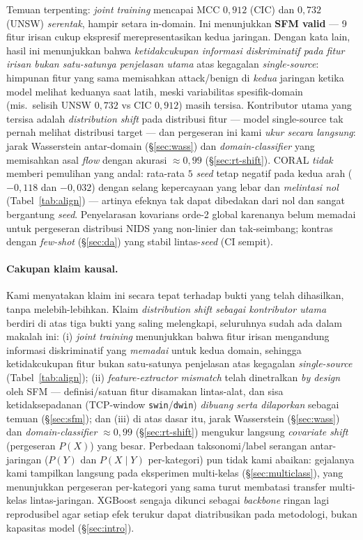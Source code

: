 \documentclass[11pt,a4paper]{article}
\begin{document}
Temuan terpenting: \emph{joint training} mencapai MCC $0{,}912$ (CIC) dan
$0{,}732$ (UNSW) \emph{serentak}, hampir setara in-domain. Ini menunjukkan
\textbf{SFM valid} --- 9 fitur irisan cukup ekspresif merepresentasikan kedua
jaringan. Dengan kata lain, hasil ini menunjukkan bahwa \emph{ketidakcukupan
informasi diskriminatif pada fitur irisan bukan satu-satunya penjelasan utama} atas
kegagalan \emph{single-source}: himpunan fitur yang sama memisahkan attack/benign di
\emph{kedua} jaringan ketika model melihat keduanya saat latih, meski variabilitas
spesifik-domain (mis.\ selisih UNSW $0{,}732$ vs CIC $0{,}912$) masih tersisa.
Kontributor utama yang tersisa
adalah \emph{distribution shift} pada distribusi fitur --- model single-source tak
pernah melihat distribusi target --- dan pergeseran ini kami \emph{ukur secara
langsung}: jarak Wasserstein antar-domain (\S\ref{sec:wass}) dan
\emph{domain-classifier} yang memisahkan asal \emph{flow} dengan akurasi
$\approx 0{,}99$ (\S\ref{sec:rt-shift}). CORAL \emph{tidak} memberi pemulihan yang
andal: rata-rata $5$ \emph{seed} tetap negatif pada kedua arah ($-0{,}118$ dan
$-0{,}032$) dengan selang kepercayaan yang lebar dan \emph{melintasi nol}
(Tabel~\ref{tab:align}) --- artinya efeknya tak dapat dibedakan dari nol dan sangat
bergantung \emph{seed}. Penyelarasan kovarians orde-2 global karenanya belum memadai
untuk pergeseran distribusi NIDS yang non-linier dan tak-seimbang; kontras dengan
\emph{few-shot} (\S\ref{sec:da}) yang stabil lintas-\emph{seed} (CI sempit).

\paragraph{Cakupan klaim kausal.} Kami menyatakan klaim ini
secara tepat terhadap bukti yang telah dihasilkan, tanpa melebih-lebihkan. Klaim
\emph{distribution shift sebagai kontributor utama} berdiri di atas tiga bukti yang
saling melengkapi, seluruhnya sudah ada dalam makalah ini: (i) \emph{joint training}
menunjukkan bahwa fitur irisan mengandung informasi diskriminatif yang \emph{memadai}
untuk kedua domain, sehingga ketidakcukupan fitur bukan satu-satunya penjelasan atas
kegagalan \emph{single-source} (Tabel~\ref{tab:align}); (ii) \emph{feature-extractor mismatch} telah dinetralkan
\emph{by design} oleh SFM --- definisi/satuan fitur disamakan lintas-alat, dan sisa
ketidaksepadanan (TCP-window \texttt{swin}/\texttt{dwin}) \emph{dibuang serta
dilaporkan} sebagai temuan (\S\ref{sec:sfm}); dan (iii) di atas dasar itu, jarak
Wasserstein (\S\ref{sec:wass}) dan \emph{domain-classifier} $\approx 0{,}99$
(\S\ref{sec:rt-shift}) mengukur langsung \emph{covariate shift} (pergeseran $P(X)$)
yang besar. Perbedaan taksonomi/label serangan antar-jaringan ($P(Y)$ dan
$P(X\mid Y)$ per-kategori) pun tidak kami abaikan: gejalanya kami tampilkan langsung
pada eksperimen multi-kelas (\S\ref{sec:multiclass}), yang menunjukkan pergeseran
per-kategori yang sama turut membatasi transfer multi-kelas lintas-jaringan. XGBoost
sengaja dikunci sebagai \emph{backbone} ringan lagi reprodusibel agar setiap efek
terukur dapat diatribusikan pada metodologi, bukan kapasitas model
(\S\ref{sec:intro}).
\end{document}
